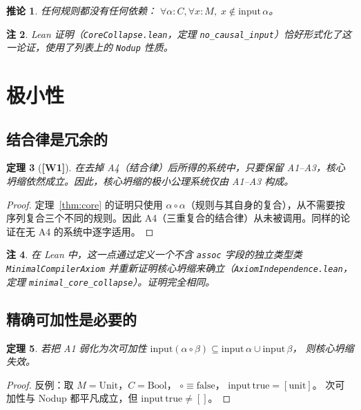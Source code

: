 \documentclass[11pt]{ctexart}
\newcommand{\wone}[1]{\textcolor{wcolor}{\textbf{[#1]}}}
\newtheorem{theorem}{定理}
\newtheorem{corollary}[theorem]{推论}
\newtheorem{remark}[theorem]{注}
\begin{document}
\begin{corollary}
\label{cor:no-dependency}
任何规则都没有任何依赖：
$\forall \alpha : C, \forall x : M,\; x \notin \mathrm{input}\,\alpha$。
\end{corollary}

\begin{remark}
Lean 证明（\texttt{CoreCollapse.lean}，定理
\texttt{no\_causal\_input}）恰好形式化了这一论证，使用了列表上的
\texttt{Nodup} 性质。
\end{remark}

\section{极小性}
\label{sec:minimal}

\subsection{结合律是冗余的}

\begin{theorem}[\wone{W1}]
\label{thm:assoc-redundant}
在去掉 A4（结合律）后所得的系统中，只要保留 A1--A3，核心坍缩依然成立。因此，核心坍缩的极小公理系统仅由 A1--A3 构成。
\end{theorem}

\begin{proof}
定理~\ref{thm:core} 的证明只使用 $\alpha \circ \alpha$（规则与其自身的复合），从不需要按序列复合三个不同的规则。因此 A4（三重复合的结合律）从未被调用。同样的论证在无 A4 的系统中逐字适用。
\end{proof}

\begin{remark}
在 Lean 中，这一点通过定义一个不含 \texttt{assoc} 字段的独立类型类 \texttt{MinimalCompilerAxiom} 并重新证明核心坍缩来确立（\texttt{AxiomIndependence.lean}，定理 \texttt{minimal\_core\_collapse}）。证明完全相同。
\end{remark}

\subsection{精确可加性是必要的}

\begin{theorem}
\label{thm:subadd-fails}
若把 A1 弱化为次可加性
$\mathrm{input}(\alpha \circ \beta) \subseteq
 \mathrm{input}\,\alpha \cup \mathrm{input}\,\beta$，
则核心坍缩失效。
\end{theorem}

\begin{proof}
反例：取 $M = \mathrm{Unit}$，$C = \mathrm{Bool}$，
$\circ \equiv \mathrm{false}$，
$\mathrm{input}\,\mathrm{true} = [\mathrm{unit}]$。
次可加性与 Nodup 都平凡成立，但
$\mathrm{input}\,\mathrm{true} \neq []$。
\end{proof}
\end{document}
